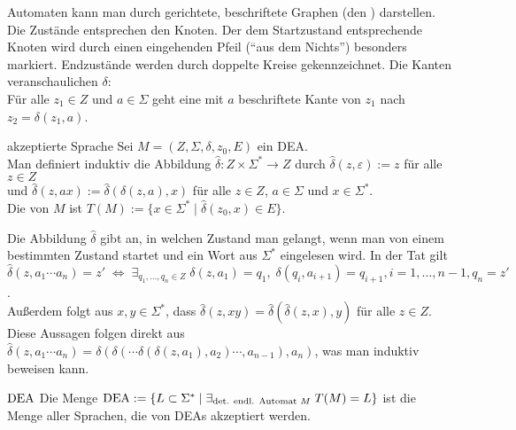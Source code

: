 \begin{Bem}
    Automaten kann man durch gerichtete, beschriftete Graphen
    (den ) darstellen.
    Die Zustände entsprechen den Knoten.
    Der dem Startzustand entsprechende Knoten wird durch einen eingehenden
    Pfeil ("`aus dem Nichts"') besonders markiert.
    Endzustände werden durch doppelte Kreise gekennzeichnet.
    Die Kanten veranschaulichen $\delta$:\\
    Für alle $z_1 \in Z$ und $a \in \Sigma$ geht eine mit $a$ beschriftete
    Kante von $z_1$ nach $z_2 = \delta(z_1, a)$.
\end{Bem}

\linie

\begin{Def}{akzeptierte Sprache}
    Sei $M = (Z, \Sigma, \delta, z_0, E)$ ein DEA.\\
    Man definiert induktiv die Abbildung
    $\widehat{\delta}\colon Z \times \Sigma^\ast \rightarrow Z$ durch
    $\widehat{\delta}(z, \varepsilon) := z$ für alle $z \in Z$\\
    und $\widehat{\delta}(z, ax) := \widehat{\delta}(\delta(z, a), x)$ für alle
    $z \in Z$, $a \in \Sigma$ und $x \in \Sigma^\ast$.\\
    Die von $M$  ist
    $T(M) := \{x \in \Sigma^\ast \;|\; \widehat{\delta}(z_0, x) \in E\}$.
\end{Def}

\begin{Bem}
    Die Abbildung $\widehat{\delta}$ gibt an, in welchen Zustand man gelangt,
    wenn man von einem bestimmten Zustand startet und ein Wort aus
    $\Sigma^\ast$ eingelesen wird.
    In der Tat gilt\\
    $\widehat{\delta}(z, a_1 \dotsb a_n) = z'
    \;\Leftrightarrow\; \exists_{q_1, \dotsc, q_n \in Z}\;
    \delta(z, a_1) = q_1,\; \delta(q_i, a_{i+1}) = q_{i+1},
    i = 1, \dotsc, n - 1, q_n = z'$.\\
    Außerdem folgt aus $x, y \in \Sigma^\ast$, dass
    $\widehat{\delta}(z, xy) = \widehat{\delta}(\widehat{\delta}(z, x), y)$
    für alle $z \in Z$.\\
    Diese Aussagen folgen direkt aus
    $\widehat{\delta}(z, a_1 \dotsb a_n) =
    \delta(\delta(\dotsb\delta(\delta(z,
    a_1), a_2)\dotsb, a_{n-1}), a_n)$,
    was man induktiv beweisen kann.
\end{Bem}

\linie
\pagebreak

\begin{Def}{$\text{DEA}$}
    Die Menge $\text{DEA} := \{L \subset \Sigma^\ast \;|\;
    \exists_{\text{det. endl. Automat } M}\; T(M) = L\}$
    ist die Menge aller Sprachen, die von DEAs akzeptiert werden.
\end{Def}

